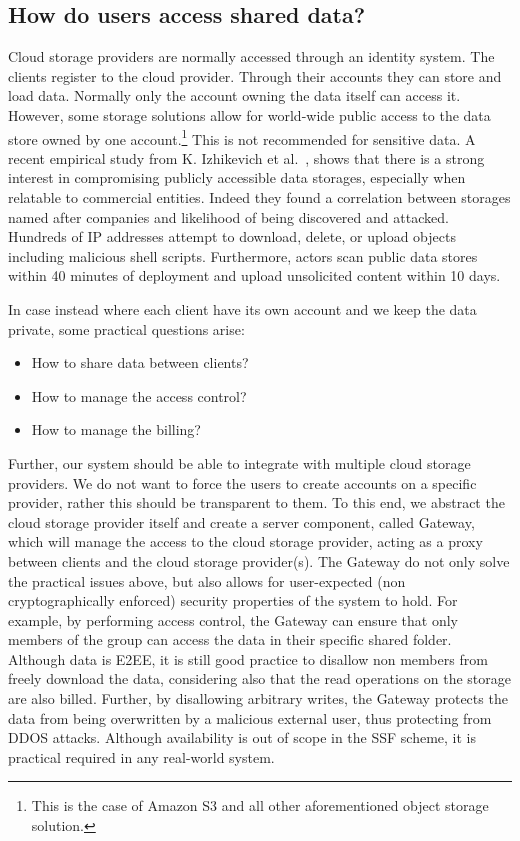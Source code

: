 \subsection{How do users access shared data?}\label{sc:cloud-storage-access-and-billing}
Cloud storage providers are normally accessed through an
identity system. The clients register to the cloud provider.
Through their accounts they can store and load data.
Normally only the account owning the data itself can access it.
However, some storage solutions allow for world-wide public access 
to the data store owned by one account.\footnote{This is the case of Amazon S3 and all other aforementioned object storage solution.} 
This is not recommended for sensitive data.
A recent empirical study from K. Izhikevich et al.~\cite{izhikevich2023using},
shows that there is a strong interest
in compromising publicly accessible data storages,
especially when relatable to commercial entities.
Indeed they found a correlation between storages named after companies and likelihood of being discovered and attacked.
Hundreds of IP addresses attempt to download, delete, or upload objects including malicious shell scripts. 
Furthermore, actors scan public data stores within 40 minutes of deployment and upload unsolicited content within 10 days.

In case instead where each client have its own account
and we keep the data private,
some practical questions arise:
\begin{itemize}
    \item How to share data between clients?
    \item How to manage the access control?
    \item How to manage the billing?
\end{itemize}
Further, our system should be able to integrate with multiple
cloud storage providers. We do not want to force the users to
create accounts on a specific provider, rather this should be
transparent to them.
To this end, we abstract the cloud storage provider itself
and create a server component, called Gateway, which will manage
the access to the cloud storage provider, acting as a proxy
between clients and the cloud storage provider(s).
The Gateway do not only solve the practical issues above, but also
allows for user-expected (non cryptographically enforced) 
security properties of the system to hold.
For example, by performing access control, the Gateway can ensure
that only members of the group can access the data in their
specific shared folder. Although data is E2EE, it is still
good practice to disallow non members from freely download the data,
considering also that the read operations on the storage are also billed.
Further, by disallowing arbitrary writes, the Gateway
protects the data from being overwritten by a malicious external user,
thus protecting from DDOS attacks.
Although availability is out of scope in the SSF scheme,
it is practical required in any real-world system.


